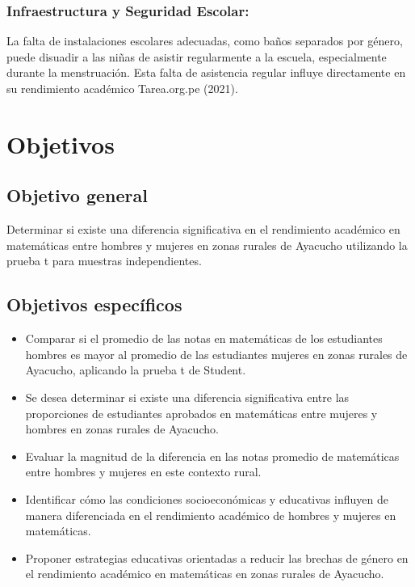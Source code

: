 \documentclass[
]{article}
\begin{document}
\subsubsection{Infraestructura y Seguridad
Escolar:}\label{infraestructura-y-seguridad-escolar}

La falta de instalaciones escolares adecuadas, como baños separados por
género, puede disuadir a las niñas de asistir regularmente a la escuela,
especialmente durante la menstruación. Esta falta de asistencia regular
influye directamente en su rendimiento académico Tarea.org.pe (2021).

\section*{Objetivos}\label{objetivos}

\subsection*{Objetivo general}\label{objetivo-general}

\vspace{0.25cm}

Determinar si existe una diferencia significativa en el rendimiento
académico en matemáticas entre hombres y mujeres en zonas rurales de
Ayacucho utilizando la prueba t para muestras independientes.

\subsection*{Objetivos específicos}\label{objetivos-especuxedficos}

\vspace{0.5cm}

\begin{itemize}
    \item Comparar si el promedio de las notas en matemáticas de los estudiantes hombres es mayor al promedio de las estudiantes mujeres en zonas rurales de Ayacucho, aplicando la prueba t de Student.
    \item Se desea determinar si existe una diferencia significativa entre las proporciones de estudiantes aprobados en matemáticas entre mujeres y hombres en zonas rurales de Ayacucho.
    \item Evaluar la magnitud de la diferencia en las notas promedio de matemáticas entre hombres y mujeres en este contexto rural.
    \item Identificar cómo las condiciones socioeconómicas y educativas influyen de manera diferenciada en el rendimiento académico de hombres y mujeres en matemáticas.
    \item Proponer estrategias educativas orientadas a reducir las brechas de género en el rendimiento académico en matemáticas en zonas rurales de Ayacucho.
\end{itemize}
\end{document}
